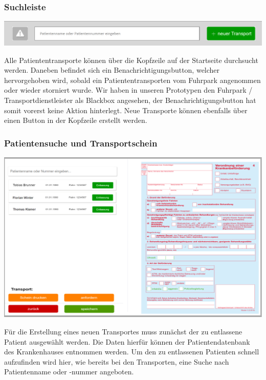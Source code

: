 \documentclass[a4paper, ngerman, 12pt]{scrartcl}
\begin{document}
\subsubsection{Suchleiste}
\begin{center}
\begin{minipage}{0.8\textwidth}
	\centering
	\includegraphics[width=\textwidth]{Bilder/ap1Search.png}
	\label{img:ap1search}
\end{minipage}
\end{center}
Alle Patiententransporte können über die Kopfzeile auf der Startseite durchsucht werden. Daneben befindet sich ein Benachrichtigungsbutton, welcher hervorgehoben wird, sobald ein Patiententransporten vom Fuhrpark angenommen oder wieder storniert wurde. Wir haben in unseren Prototypen den Fuhrpark / Transportdienstleister als Blackbox angesehen, der Benachrichtigungsbutton hat somit vorerst keine Aktion hinterlegt. Neue Transporte können ebenfalls über einen Button in der Kopfzeile erstellt werden.
\subsubsection{Patientensuche und Transportschein}
\begin{center}
\begin{minipage}{0.8\textwidth}
	\centering
	\includegraphics[width=\textwidth]{Bilder/ap1Frame2.png}
	\label{img:ap1frame2}
\end{minipage}
\end{center}
Für die Erstellung eines neuen Transportes muss zunächst der zu entlassene Patient ausgewählt werden. Die Daten hierfür können der Patientendatenbank des Krankenhauses entnommen werden. Um den zu entlassenen Patienten schnell aufzufinden wird hier, wie bereits bei den Transporten, eine Suche nach Patientenname oder -nummer angeboten.\\
\end{document}
